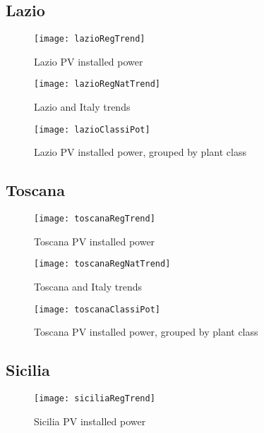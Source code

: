 \documentclass[12pt,a4paper,openright,twoside]{report}
\begin{document}
\clearpage

\subsection*{Lazio}

\begin{figure}[hp]
	\centering
	\texttt{[image: lazioRegTrend]}
	\caption{Lazio PV installed power}
	\label{lazioRegTrend}
\end{figure}

\begin{figure}[hp]
	\centering
	\texttt{[image: lazioRegNatTrend]}
	\caption{Lazio and Italy trends}
	\label{lazioRegNatTrend}
\end{figure}

\begin{figure}[hp]
	\centering
	\texttt{[image: lazioClassiPot]}
	\caption{Lazio PV installed power, grouped by plant class}
	\label{lazioClassiPot}
\end{figure}

\clearpage

\subsection*{Toscana}

\begin{figure}[hp]
	\centering
	\texttt{[image: toscanaRegTrend]}
	\caption{Toscana PV installed power}
	\label{toscanaRegTrend}
\end{figure}

\begin{figure}[hp]
	\centering
	\texttt{[image: toscanaRegNatTrend]}
	\caption{Toscana and Italy trends}
	\label{toscanaRegNatTrend}
\end{figure}

\begin{figure}[hp]
	\centering
	\texttt{[image: toscanaClassiPot]}
	\caption{Toscana PV installed power, grouped by plant class}
	\label{toscanaClassiPot}
\end{figure}

\subsection*{Sicilia}

\begin{figure}[hp]
	\centering
	\texttt{[image: siciliaRegTrend]}
	\caption{Sicilia PV installed power}
	\label{siciliaRegTrend}
\end{figure}
\end{document}
